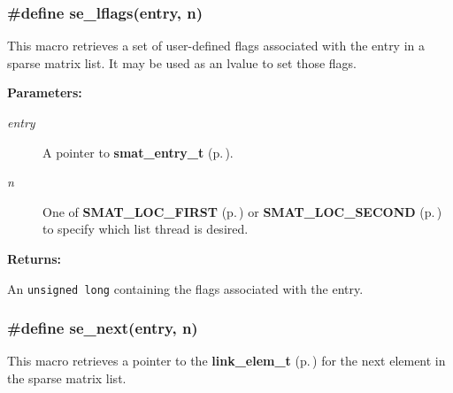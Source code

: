 \subsubsection{\setlength{\rightskip}{0pt plus 5cm}\#define se\_\-lflags(entry, n)}\label{group__dbprim__smat_a46}




 This macro retrieves a set of user-defined flags associated with the entry in a sparse matrix list. It may be used as an lvalue to set those flags.\begin{Desc}
\item[{\bf Parameters: }]\par
\begin{description}
\item[
{\em entry}]A pointer to {\bf smat\_\-entry\_\-t} {\rm (p.\,\pageref{group__dbprim__smat_a2})}. \item[
{\em n}]One of {\bf SMAT\_\-LOC\_\-FIRST} {\rm (p.\,\pageref{group__dbprim__smat_a48a102})} or {\bf SMAT\_\-LOC\_\-SECOND} {\rm (p.\,\pageref{group__dbprim__smat_a48a103})} to specify which list thread is desired.

\end{description}
\end{Desc}
\begin{Desc}
\item[{\bf Returns: }]\par
An {\tt unsigned long} containing the flags associated with the entry. \end{Desc}
\subsubsection{\setlength{\rightskip}{0pt plus 5cm}\#define se\_\-next(entry, n)}\label{group__dbprim__smat_a44}




 This macro retrieves a pointer to the {\bf link\_\-elem\_\-t} {\rm (p.\,\pageref{group__dbprim__link_a1})} for the next element in the sparse matrix list.

